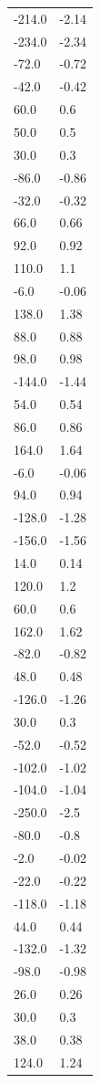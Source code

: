 \begin{longtable}{ll}
-214.0 & -2.14 \\
-234.0 & -2.34 \\
-72.0 & -0.72 \\
-42.0 & -0.42 \\
60.0 & 0.6 \\
50.0 & 0.5 \\
30.0 & 0.3 \\
-86.0 & -0.86 \\
-32.0 & -0.32 \\
66.0 & 0.66 \\
92.0 & 0.92 \\
110.0 & 1.1 \\
-6.0 & -0.06 \\
138.0 & 1.38 \\
88.0 & 0.88 \\
98.0 & 0.98 \\
-144.0 & -1.44 \\
54.0 & 0.54 \\
86.0 & 0.86 \\
164.0 & 1.64 \\
-6.0 & -0.06 \\
94.0 & 0.94 \\
-128.0 & -1.28 \\
-156.0 & -1.56 \\
14.0 & 0.14 \\
120.0 & 1.2 \\
60.0 & 0.6 \\
162.0 & 1.62 \\
-82.0 & -0.82 \\
48.0 & 0.48 \\
-126.0 & -1.26 \\
30.0 & 0.3 \\
-52.0 & -0.52 \\
-102.0 & -1.02 \\
-104.0 & -1.04 \\
-250.0 & -2.5 \\
-80.0 & -0.8 \\
-2.0 & -0.02 \\
-22.0 & -0.22 \\
-118.0 & -1.18 \\
44.0 & 0.44 \\
-132.0 & -1.32 \\
-98.0 & -0.98 \\
26.0 & 0.26 \\
30.0 & 0.3 \\
38.0 & 0.38 \\
124.0 & 1.24 \\

\end{longtable}
